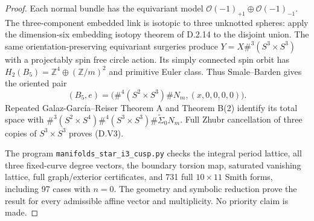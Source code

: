 \begin{proof}
Each normal bundle has the equivariant model
$\mathcal O(-1)_{+1}\oplus\mathcal O(-1)_{-1}$.
The three-component embedded link is isotopic to three
unknotted spheres: apply the dimension-six embedding
isotopy theorem of D.2.14 to the disjoint union.
The same orientation-preserving equivariant surgeries
produce
$Y=X\#^3(S^3\times S^3)$ with a projectably spin free
circle action. Its simply connected spin orbit has
$H_2(B_5)=\mathbb Z^4\oplus(\mathbb Z/m)^2$ and primitive
Euler class. Thus Smale--Barden gives the oriented pair
\[
 (B_5,e)=\bigl(\#^4(S^2\times S^3)\#N_m,
                                      (x,0,0,0,0)\bigr).
\]
Repeated Galaz-Garc\'ia--Reiser Theorem A and Theorem B(2)
identify its total space with
$\#^3(S^2\times S^4)\#^4(S^3\times S^3)
\#\widetilde\Sigma_0N_m$.
Full Zhubr cancellation of three copies of $S^3\times S^3$
proves (D.V3).

The program \texttt{manifolds\_star\_i3\_cusp.py} checks
the integral period lattice, all three fixed-curve degree
vectors, the boundary torsion map, saturated vanishing
lattice, full graph/exterior certificates, and 731 full
$10\times11$ Smith forms, including 97 cases with $n=0$.
The geometry and symbolic reduction prove the result
for every admissible affine vector and multiplicity.
No priority claim is made.
\end{proof}

